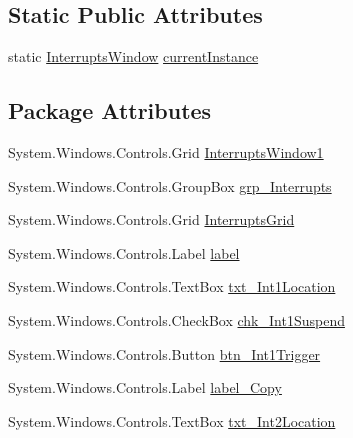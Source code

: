 \subsection*{Static Public Attributes}
\begin{DoxyCompactItemize}
\item 
static \hyperlink{class_c_p_u___o_s___simulator_1_1_interrupts_window}{Interrupts\+Window} \hyperlink{class_c_p_u___o_s___simulator_1_1_interrupts_window_ad73f79539e1ba0a2e3c6cd366a3cac05}{current\+Instance}
\end{DoxyCompactItemize}
\subsection*{Package Attributes}
\begin{DoxyCompactItemize}
\item 
System.\+Windows.\+Controls.\+Grid \hyperlink{class_c_p_u___o_s___simulator_1_1_interrupts_window_a234d09249cc6ab17ea1d5f6529eaeb4c}{Interrupts\+Window1}
\item 
System.\+Windows.\+Controls.\+Group\+Box \hyperlink{class_c_p_u___o_s___simulator_1_1_interrupts_window_abc6633e210bdae6fbcb0fb057c138c16}{grp\+\_\+\+Interrupts}
\item 
System.\+Windows.\+Controls.\+Grid \hyperlink{class_c_p_u___o_s___simulator_1_1_interrupts_window_a759a6e63890b53883639d9b9b40e5688}{Interrupts\+Grid}
\item 
System.\+Windows.\+Controls.\+Label \hyperlink{class_c_p_u___o_s___simulator_1_1_interrupts_window_a80190c28f7bf755ea3cc3d286fa7cbde}{label}
\item 
System.\+Windows.\+Controls.\+Text\+Box \hyperlink{class_c_p_u___o_s___simulator_1_1_interrupts_window_a25ab24a2ca5773a8bed6423333924ec1}{txt\+\_\+\+Int1\+Location}
\item 
System.\+Windows.\+Controls.\+Check\+Box \hyperlink{class_c_p_u___o_s___simulator_1_1_interrupts_window_a5dfca155c40a8043ed74854d0368dd5f}{chk\+\_\+\+Int1\+Suspend}
\item 
System.\+Windows.\+Controls.\+Button \hyperlink{class_c_p_u___o_s___simulator_1_1_interrupts_window_aa07297ac7d16c66b42c2b390e7fca08e}{btn\+\_\+\+Int1\+Trigger}
\item 
System.\+Windows.\+Controls.\+Label \hyperlink{class_c_p_u___o_s___simulator_1_1_interrupts_window_adad8aa8cfa360c908262d4a4dc39ec73}{label\+\_\+\+Copy}
\item 
System.\+Windows.\+Controls.\+Text\+Box \hyperlink{class_c_p_u___o_s___simulator_1_1_interrupts_window_a9e1fdb0d7e2bf6e782b6dfb6894fb5d1}{txt\+\_\+\+Int2\+Location}

\end{DoxyCompactItemize}
